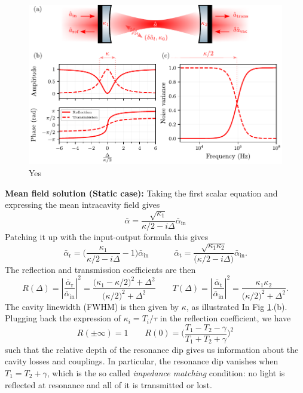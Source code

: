 \begin{figure}
\centering
\includegraphics[width=\textwidth]{./chap2/fig/CavitySimple.pdf}
\caption{Yes} 
\label{fig:CavitySimple}
\end{figure}



\noindent \textbf{Mean field solution (Static case): }Taking the first scalar equation and expressing the mean intracavity field gives 
\begin{equation}
  \bar{\alpha} =  \frac{\sqrt{\kappa_1}}{\kappa/2-i\Delta}  \bar{\alpha}_{\mathrm{in}} 
\end{equation}
Patching it up with the input-output formula this gives 
\begin{equation}
  \bar{\alpha}_{\mathrm{r}} =  \Bigg( \frac{\kappa_1}{\kappa/2-i\Delta} - 1 \Bigg)  \bar{\alpha}_{\mathrm{in}}   \quad \quad \quad  \bar{\alpha}_{\mathrm{t}} =  \frac{\sqrt{\kappa_1 \kappa_2}}{\Big(\kappa/2-i\Delta\Big)} \bar{\alpha}_{\mathrm{in}}.
\end{equation}
The reflection and transmission coefficients are then
\begin{equation}
R(\Delta) = \left|\frac{\bar{\alpha}_{\mathrm{r}}}{\bar{\alpha}_{\mathrm{in}}}\right|^2
= \frac{\bigl(\kappa_1-\kappa/2\bigr)^2+\Delta^2}{\bigl(\kappa/2)^2+\Delta^2} \quad \quad
T(\Delta) = \left|\frac{\bar{\alpha}_{\mathrm{t}}}{\bar{\alpha}_{\mathrm{in}}}\right|^2
= \frac{\kappa_1\kappa_2}{\bigl(\kappa/2\bigr)^2+\Delta^2}.
\end{equation}
The cavity linewidth (FWHM) is then given by $\kappa$, as illustrated In Fig \ref{fig:CavitySimple}.(b). Plugging back the expression of $\kappa_i = T_i/\tau$ in the reflection coefficient, we have 
\begin{equation}
  R(\pm\infty) = 1  \qquad R(0) = \Bigg(\frac{T_1 - T_2 - \gamma}{T_1 + T_2 + \gamma}\Bigg)^2
\end{equation}
such that the relative depth of the resonance dip gives us information about the cavity losses and couplings. In particular, the resonance dip vanishes when $T_1 = T_2 + \gamma$, which is the so called \textit{impedance matching} condition: no light is reflected at resonance and all of it is transmitted or lost. \\ 

